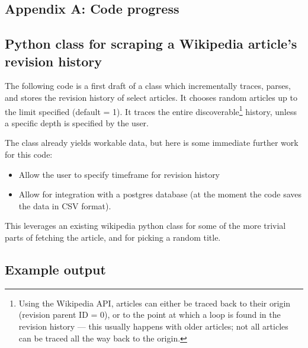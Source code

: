 \documentclass[a4paper,11pt,twoside,notitlepage]{article}
\begin{document}
        \clearpage
        \begin{appendices}
          \section{Appendix A: Code progress}
          \subsection{Python class for scraping a Wikipedia article's
            revision history}
          \label{wiki-scrape}
          The following code is a first draft of a class which incrementally
          traces, parses, and stores the revision history of select articles. It
          chooses random articles up to the limit specified (default =
          1). It traces the entire discoverable\footnote{Using the
            Wikipedia API, articles can either be traced back to their
            origin (revision parent ID = 0), or to the point at which
            a loop is found in the revision history --- this usually
            happens with older articles; not all articles can be
            traced all the way back to the origin.} history, unless a
          specific depth is specified by the user.
          
          The class already yields workable data, but here is some immediate
          further work for this code:
          \begin{itemize}
          \item Allow the user to specify timeframe for revision history
          \item Allow for integration with a postgres database (at the moment
            the code saves the data in CSV format).
          \end{itemize}
          
          This leverages an existing wikipedia python class for some
          of the more trivial parts of fetching the article, and for
          picking a random title.\cite{python-wikipedia} 
          
          
          \subsection{Example output}
          
          \clearpage

\end{appendices}
\end{document}
